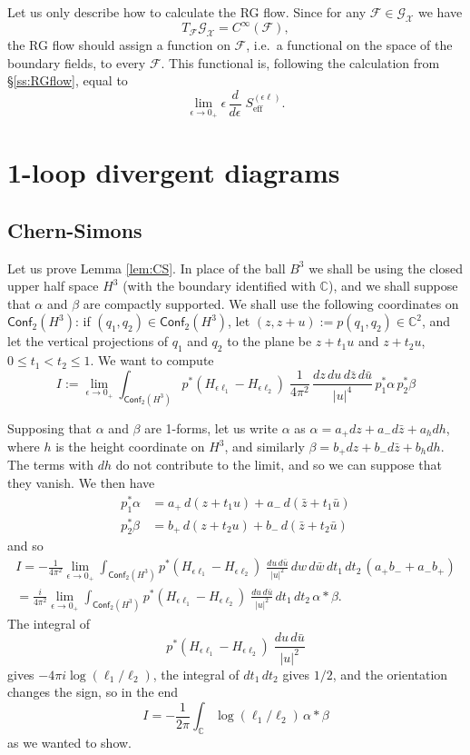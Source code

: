 \documentclass[a4paper]{amsart}
\theoremstyle{plain}
\theoremstyle{definition}
\newcommand{\mc}{\mathcal}
\newcommand{\C}{\mathbb{C}}
\newcommand{\cf}{\mathsf{Conf}}
\begin{document}
Let us only describe how to calculate the RG flow.
Since for any $\mc F\in\mc{G}_\mc X$ we have
$$T_\mc F \mc{G}_\mc X =C^\infty(\mc F), $$
the RG flow should assign a function on $\mc F$, i.e.\ a functional on the space of the boundary fields, to every $\mc F$. This functional is, following the calculation from \S\ref{ss:RGflow}, equal to
\begin{equation}\label{akszrg}
\lim_{\epsilon\to0_+} \epsilon\,\frac d{d\epsilon}\; S_\text{eff}^{(\epsilon\ell)}.
\end{equation}



\appendix

\section{1-loop divergent diagrams}
\subsection{Chern-Simons}
Let us prove Lemma \ref{lem:CS}. In place of the ball $B^3$ we shall be using the closed upper half space $H^3$ (with the boundary identified with $\C$), and we shall suppose that $\alpha$ and $\beta$ are compactly supported. We shall use the following coordinates on $\cf_2(H^3)$: if $(q_1,q_2)\in\cf_2(H^3)$, let $(z,z+u):=p(q_1,q_2)\in\C^2$, and let the vertical projections of $q_1$ and $q_2$ to the plane be $z+t_1u$ and $z+t_2u$, $0\leq t_1<t_2\leq1$. We want to compute
$$I:=
\lim_{\epsilon\to0_+}\int_{\cf_2(H^3)}p^*(H_{\epsilon\ell_1}-H_{\epsilon\ell_2})\;\frac1{4\pi^2}\,\frac{dz\,du\,d\bar z\,d\bar u}{|u|^4}\,p_1^*\alpha\, p_2^*\beta
$$

Supposing that $\alpha$ and $\beta$ are 1-forms, let us write $\alpha$ as $\alpha=a_+dz + a_-d\bar z + a_h dh$, where $h$ is the height coordinate on $H^3$, and similarly 
$\beta=b_+dz + b_-d\bar z + b_h dh$. The terms with $dh$ do not contribute to the limit, and so we can suppose that they vanish. We then have
\begin{align*}
p_1^*\alpha&=a_+\, d(z+t_1 u) + a_-\, d(\bar z + t_1\bar u)\\
p_2^*\beta&=b_+\, d(z+t_2 u) + b_-\, d(\bar z + t_2\bar u)
\end{align*}
and so
\begin{multline*}
I=-\frac1{4\pi^2}\lim_{\epsilon\to0_+}\int_{\cf_2(H^3)}p^*(H_{\epsilon\ell_1}-H_{\epsilon\ell_2})\;\frac{du\,d\bar u}{|u|^2}\,dw\,d\bar w\,dt_1\,dt_2\,(a_+b_-+a_-b_+) \\
=\frac i{4\pi^2}\lim_{\epsilon\to0_+}\int_{\cf_2(H^3)}p^*(H_{\epsilon\ell_1}-H_{\epsilon\ell_2})\;\frac{du\,d\bar u}{|u|^2}\,dt_1\,dt_2\,\alpha *\beta.
\end{multline*}
The integral of 
$$p^*(H_{\epsilon\ell_1}-H_{\epsilon\ell_2})\;\frac{du\,d\bar u}{|u|^2}$$
gives $-4\pi i\log(\ell_1/\ell_2)$, the integral of $dt_1\,dt_2$ gives $1/2$, and the orientation changes the sign, so in the end
$$I=-\frac1{2\pi}\int_\C\log(\ell_1/\ell_2)\,\alpha*\beta$$
as we wanted to show.
\end{document}
